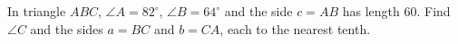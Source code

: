 In triangle $ABC$, $\angle A=82^\circ$, $\angle B=64^\circ$ and the side $c=AB$ has length $60$. Find $\angle C$ and the sides $a=BC$ and $b=CA$, each to the nearest tenth.
